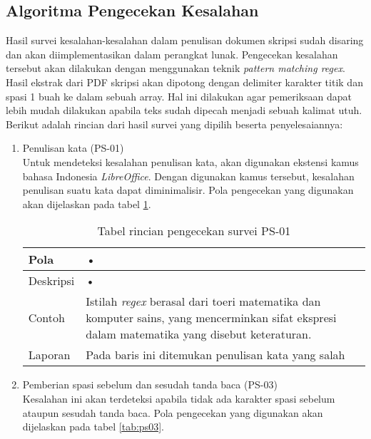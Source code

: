 \subsection{Algoritma Pengecekan Kesalahan}
Hasil survei kesalahan-kesalahan dalam penulisan dokumen skripsi sudah disaring dan akan diimplementasikan dalam perangkat lunak. Pengecekan kesalahan tersebut akan dilakukan dengan menggunakan teknik \textit{pattern matching regex}. Hasil ekstrak dari PDF skripsi akan dipotong dengan delimiter karakter titik dan spasi 1 buah ke dalam sebuah array. Hal ini dilakukan agar pemeriksaan dapat lebih mudah dilakukan apabila teks sudah dipecah menjadi sebuah kalimat utuh. Berikut adalah rincian dari hasil survei yang dipilih beserta penyelesaiannya:

\begin{enumerate}
	\item Penulisan kata (PS-01) \\
	Untuk mendeteksi kesalahan penulisan kata, akan digunakan ekstensi kamus bahasa Indonesia \textit{LibreOffice}. Dengan digunakan kamus tersebut, kesalahan penulisan suatu kata dapat diminimalisir. Pola pengecekan yang digunakan akan dijelaskan pada tabel \ref{tab:ps01}.
		
	\begin{table}[H]
		\renewcommand{\arraystretch}{1.5}
		\caption {Tabel rincian pengecekan survei PS-01} 
		\label{tab:ps01}
		\begin{center}
			\begin{tabular}{|p{3.5cm} |p{10.5cm}|}
			\hline 
			Pola & • \\ 
			\hline 
			Deskripsi & • \\ 
			\hline 
			Contoh & Istilah \textit{regex} berasal dari toeri matematika dan komputer sains, yang mencerminkan sifat ekspresi dalam matematika yang disebut keteraturan. \\ 
			\hline 
			Laporan & Pada baris ini ditemukan penulisan kata yang salah \\ 
			\hline
			\end{tabular}
		\end{center}
	\end{table}
	
	\item Pemberian spasi sebelum dan sesudah tanda baca (PS-03) \\
	Kesalahan ini akan terdeteksi apabila tidak ada karakter spasi sebelum ataupun sesudah tanda baca. Pola pengecekan yang digunakan akan dijelaskan pada tabel \ref{tab:ps03}.
		

\end{enumerate}
